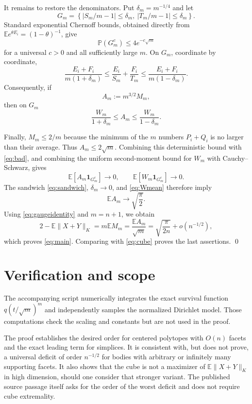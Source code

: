 \documentclass[11pt]{article}
\newcommand{\E}{\mathbb E}
\newcommand{\Pp}{\mathbb P}
\newcommand{\one}{\mathbf 1}
\begin{document}
It remains to restore the denominators.  Put $\delta_m=m^{-1/4}$ and let
\[
 G_m=\left\{\left|S_m/m-1\right|\le\delta_m,
                 \ \left|T_m/m-1\right|\le\delta_m\right\}.
\]
Standard exponential Chernoff bounds, obtained directly from
$\E e^{\theta E_i}=(1-\theta)^{-1}$, give
\begin{equation}\label{eq:bad}
 \Pp(G_m^c)\le4e^{-c\sqrt m}
\end{equation}
for a universal $c>0$ and all sufficiently large $m$.  On $G_m$, coordinate
by coordinate,
\[
 \frac{E_i+F_i}{m(1+\delta_m)}
 \le \frac{E_i}{S_m}+\frac{F_i}{T_m}
 \le \frac{E_i+F_i}{m(1-\delta_m)}.
\]
Consequently, if
\[
 A_m:=m^{3/2}M_m,
\]
then on $G_m$
\begin{equation}\label{eq:sandwich}
 \frac{W_m}{1+\delta_m}\le A_m\le
 \frac{W_m}{1-\delta_m}.
\end{equation}

Finally, $M_m\le 2/m$ because the minimum of the $m$ numbers
$P_i+Q_i$ is no larger than their average.  Thus $A_m\le2\sqrt m$.
Combining this deterministic bound with \eqref{eq:bad}, and combining the
uniform second-moment bound for $W_m$ with Cauchy--Schwarz, gives
\[
 \E[A_m\one_{G_m^c}]\longrightarrow0,
 \qquad
 \E[W_m\one_{G_m^c}]\longrightarrow0.
\]
The sandwich \eqref{eq:sandwich}, $\delta_m\to0$, and \eqref{eq:Wmean}
therefore imply
\begin{equation}\label{eq:Amean}
 \E A_m\longrightarrow\sqrt{\frac\pi2}.
\end{equation}
Using \eqref{eq:gaugeidentity} and $m=n+1$, we obtain
\[
 2-\E\|X+Y\|_K
 =m\E M_m
 =\frac{\E A_m}{\sqrt m}
 =\sqrt{\frac{\pi}{2n}}+o(n^{-1/2}),
\]
which proves \eqref{eq:main}.  Comparing with \eqref{eq:cube} proves the
last assertions. \qed

\section{Verification and scope}

The accompanying script numerically integrates the exact survival function
$q(t/\sqrt m)^m$ and independently samples the normalized Dirichlet model.
Those computations check the scaling and constants but are not used in the
proof.

The proof establishes the desired order for centered polytopes with
$O(n)$ facets and the exact leading term for simplices.  It is consistent
with, but does not prove, a universal deficit of order $n^{-1/2}$ for bodies
with arbitrary or infinitely many supporting facets.  It also shows that the cube is not a maximizer of
$\E\|X+Y\|_K$ in high dimension, should one consider that stronger variant.
The published source passage itself asks for the order of the worst deficit
and does not require cube extremality.
\end{document}
